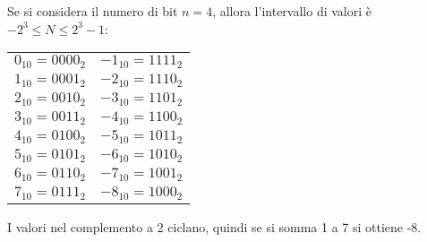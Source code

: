 \documentclass[a4paper]{article}
\theoremstyle{break}
\theoremstyle{break}
\theoremstyle{break}
\theoremstyle{break}
\begin{document}
Se si considera il numero di bit \( n=4 \), allora l'intervallo di valori è
\( -2^3 \le N \le 2^3-1 \):

\begin{center}
	\begin{tabular}{c|c}
		\( 0_{10} = 0000_{2}\) & \( -1_{10} = 1111_{2}\) \\
		\( 1_{10} = 0001_{2}\) & \( -2_{10} = 1110_{2}\) \\
		\( 2_{10} = 0010_{2}\) & \( -3_{10} = 1101_{2}\) \\
		\( 3_{10} = 0011_{2}\) & \( -4_{10} = 1100_{2}\) \\
		\( 4_{10} = 0100_{2}\) & \( -5_{10} = 1011_{2}\) \\
		\( 5_{10} = 0101_{2}\) & \( -6_{10} = 1010_{2}\) \\
		\( 6_{10} = 0110_{2}\) & \( -7_{10} = 1001_{2}\) \\
		\( 7_{10} = 0111_{2}\) & \( -8_{10} = 1000_{2}\) \\
	\end{tabular}
\end{center}
I valori nel complemento a 2 ciclano, quindi se si somma 1 a 7 si ottiene -8.
\end{document}
